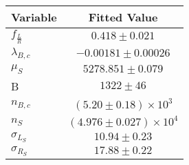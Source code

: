 \begin{tabular}[t]{lc}
\hline
Variable &Fitted Value\\
\hline\hline
$f_{\frac{L}{R}}$&$0.418\pm0.021$\\
\hline
$\lambda_{B,c}$&$-0.00181\pm0.00026$\\
\hline
$\mu_S$&$5278.851\pm0.079$\\
\hline
B&$1322\pm46$\\
\hline
$n_{B,c}$&$(5.20\pm0.18)\times 10^3$\\
\hline
$n_S$&$(4.976\pm0.027)\times 10^4$\\
\hline
$\sigma_{L_S}$&$10.94\pm0.23$\\
\hline
$\sigma_{R_S}$&$17.88\pm0.22$\\
\hline
\end{tabular}